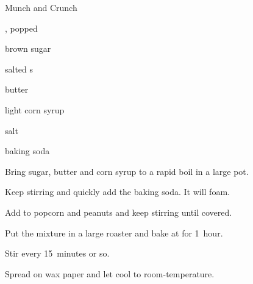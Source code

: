 \begin{recipe}{Munch and Crunch}{}{}

\begin{ingredients}
\item {} , popped 
\item {} brown sugar
\item \C{1 \half} salted s
\item {} butter
\item \C{\half} light corn syrup
\item {} salt
\item \tp{\half} baking soda
\end{ingredients}

\begin{directions}
\item Bring sugar, butter and corn syrup to a rapid boil in a large pot.
\item Keep stirring and quickly add the baking soda. It will foam.
\item Add to popcorn and peanuts and keep stirring until covered.
\item Put the mixture in a large roaster and bake at  for 1~hour.
\item Stir every 15~minutes or so.
\item Spread on wax paper and let cool to room-temperature.
\end{directions}
\end{recipe}
